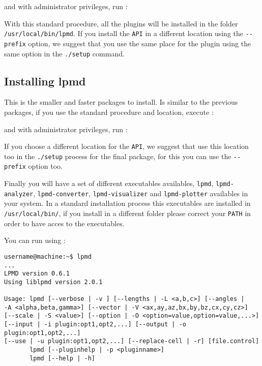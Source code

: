 
and with administrator privileges, run :


With this standard procedure, all the plugins will be installed in the folder
\verb|/usr/local/bin/lpmd|. If you install the \verb|API| in a different
location using the \verb|--prefix| option, we suggest that you use the same
place for the plugin using the same option in the \verb|./setup| command.

\subsection{Installing lpmd}

This is the smaller and faster packages to install. Is similar to the previous
packages, if you use the standard procedure and location, execute :


and with administrator privileges, run :


If you choose a different location for the \verb|API|, we suggest that use this
location too in the \verb|./setup| process for the final package, for this you
can use the \verb|--prefix| option too.

Finally you will have a set of different executables availables, \verb|lpmd|,
\verb|lpmd-analyzer|, \verb|lpmd-converter|, \verb|lpmd-visualizer| and
\verb|lpmd-plotter| availables in your system. In a standard installation
process this executables are installed in \verb|/usr/local/bin/|, if you
install {\lpmd} in a different folder please correct your \verb|PATH| in order
to have acces to the executables.

You can run {\lpmd} using :

\begin{verbatim}
username@machine:~$ lpmd
...
LPMD version 0.6.1
Using liblpmd version 2.0.1

Usage: lpmd [--verbose | -v ] [--lengths | -L <a,b,c>] [--angles | 
-A <alpha,beta,gamma>] [--vector | -V <ax,ay,az,bx,by,bz,cx,cy,cz>] 
[--scale | -S <value>] [--option | -O <option=value,option=value,...>] 
[--input | -i plugin:opt1,opt2,...] [--output | -o plugin:opt1,opt2,...] 
[--use | -u plugin:opt1,opt2,...] [--replace-cell | -r] [file.control]
       lpmd [--pluginhelp | -p <pluginname>]
       lpmd [--help | -h]
\end{verbatim}

